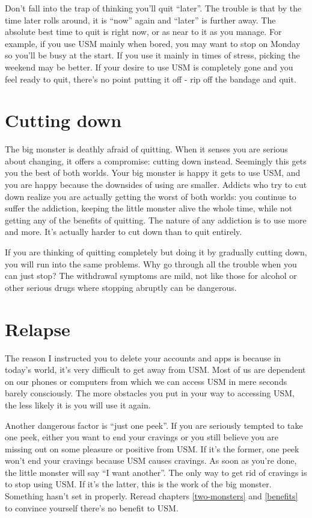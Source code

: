 \documentclass[
  openany]{book}
\begin{document}
Don't fall into the trap of thinking you'll quit ``later''. The trouble is that by the time later rolls around, it is ``now'' again and ``later'' is further away. The absolute best time to quit is right now, or as near to it as you manage. For example, if you use USM mainly when bored, you may want to stop on Monday so you'll be busy at the start. If you use it mainly in times of stress, picking the weekend may be better. If your desire to use USM is completely gone and you feel ready to quit, there's no point putting it off - rip off the bandage and quit.

\section{Cutting down}\label{cutting-down}

The big monster is deathly afraid of quitting. When it senses you are serious about changing, it offers a compromise: cutting down instead. Seemingly this gets you the best of both worlds. Your big monster is happy it gets to use USM, and you are happy because the downsides of using are smaller. Addicts who try to cut down realize you are actually getting the worst of both worlds: you continue to suffer the addiction, keeping the little monster alive the whole time, while not getting any of the benefits of quitting. The nature of any addiction is to use more and more. It's actually harder to cut down than to quit entirely.

If you are thinking of quitting completely but doing it by gradually cutting down, you will run into the same problems. Why go through all the trouble when you can just stop? The withdrawal symptoms are mild, not like those for alcohol or other serious drugs where stopping abruptly can be dangerous.

\section{Relapse}\label{relapse}

The reason I instructed you to delete your accounts and apps is because in today's world, it's very difficult to get away from USM. Most of us are dependent on our phones or computers from which we can access USM in mere seconds barely consciously. The more obstacles you put in your way to accessing USM, the less likely it is you will use it again.

Another dangerous factor is ``just one peek''. If you are seriously tempted to take one peek, either you want to end your cravings or you still believe you are missing out on some pleasure or positive from USM. If it's the former, one peek won't end your cravings because USM causes cravings. As soon as you're done, the little monster will say ``I want another''. The only way to get rid of cravings is to stop using USM. If it's the latter, this is the work of the big monster. Something hasn't set in properly. Reread chapters \ref{two-monsters} and \ref{benefits} to convince yourself there's no benefit to USM.
\end{document}
